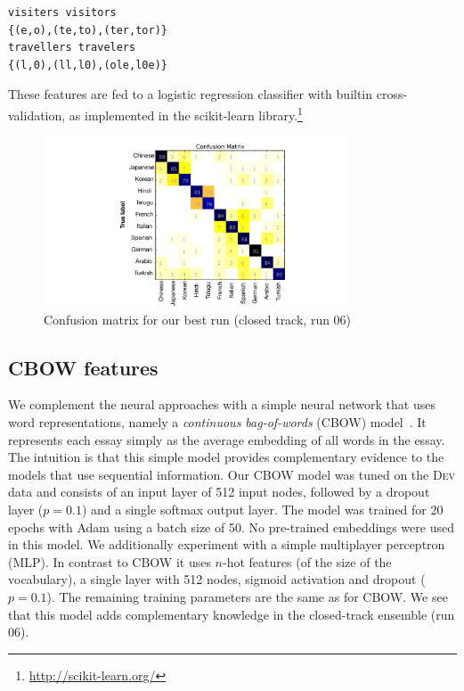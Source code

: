\documentclass[11pt,letterpaper]{article}
\begin{document}
\begin{verbatim}
visiters visitors
{(e,o),(te,to),(ter,tor)}
travellers travelers
{(l,0),(ll,l0),(ole,l0e)}
\end{verbatim}

These features are fed to a logistic regression classifier with builtin cross-validation, as implemented in the scikit-learn library.\footnote{\url{http://scikit-learn.org/}}

\begin{figure}[ht]
\centering
\includegraphics[trim={8cm 0 0 0},clip,width=0.8\textwidth]{conf_matrix_run06closed}
\caption{Confusion matrix for our best run (closed track, run 06)}
\label{fig:conf_mat}
\end{figure}

\subsection{CBOW features}
We complement the neural approaches with a simple neural network that uses word representations, namely a \textit{continuous bag-of-words} (CBOW) model~\cite{mikolov2013efficient}. It represents each essay simply as the average embedding of all words in the essay. The intuition is that this simple model provides complementary evidence to the models  that use sequential information. Our CBOW model was tuned on the \textsc{Dev} data and consists of an input layer of 512 input nodes, followed by a dropout layer ($p=0.1$) and a single softmax output layer. The model was trained for 20 epochs with Adam using a batch size of 50. No pre-trained embeddings were used in this model.
We additionally experiment with a simple multiplayer perceptron (MLP). In contrast to CBOW it uses $n$-hot features (of the size of the vocabulary), a single layer with 512 nodes, sigmoid activation and dropout ($p=0.1$). The remaining training parameters are the same as for CBOW. We see that this model adds complementary knowledge in the closed-track ensemble (run 06).
\end{document}
